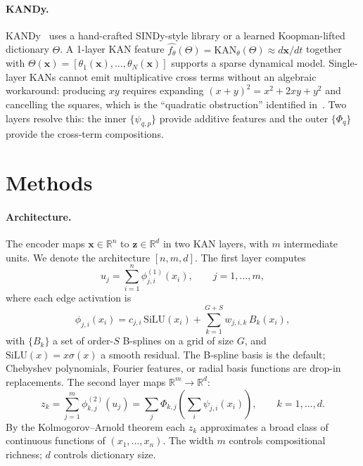 \documentclass{article}
\newcommand{\R}{\mathbb{R}}
\newcommand{\x}{\bm{x}}
\newcommand{\z}{\bm{z}}
\begin{document}
\paragraph{KANDy.}
KANDy~\cite{kandy} uses a hand-crafted SINDy-style library or a learned
Koopman-lifted dictionary $\Theta$. A 1-layer KAN feature
$\hat{f_\theta}(\Theta) = \mathrm{KAN}_\theta(\Theta) \approx d\x/dt$ together
with $\Theta(\x) = [\theta_1(\x),\dots,\theta_N(\x)]$ supports a sparse
dynamical model. Single-layer KANs cannot emit multiplicative cross terms
without an algebraic workaround: producing $xy$ requires expanding
$(x+y)^2 = x^2 + 2xy + y^2$ and cancelling the squares, which is the
``quadratic obstruction'' identified in~\cite{kandy}. Two layers resolve this:
the inner $\{\psi_{q,p}\}$ provide additive features and the outer $\{\Phi_q\}$
provide the cross-term compositions.


\section*{Methods}

\paragraph{Architecture.}
The encoder maps $\x\in\R^n$ to $\z\in\R^d$ in two KAN layers, with $m$
intermediate units. We denote the architecture $[n,m,d]$. The first layer
computes
\begin{equation}
  u_j = \sum_{i=1}^{n}\phi^{(1)}_{j,i}(x_i),\qquad j=1,\dots,m,
  \label{eq:layer1}
\end{equation}
where each edge activation is
\begin{equation}
  \phi_{j,i}(x_i) = c_{j,i}\,\mathrm{SiLU}(x_i)
    + \sum_{k=1}^{G+S} w_{j,i,k}\,B_k(x_i),
  \label{eq:kanlinear}
\end{equation}
with $\{B_k\}$ a set of order-$S$ B-splines on a grid of size $G$, and
$\mathrm{SiLU}(x) = x\sigma(x)$ a smooth residual. The B-spline basis is the
default; Chebyshev polynomials, Fourier features, or radial basis functions are
drop-in replacements. The second layer maps $\R^m\to\R^d$:
\begin{equation}
  z_k = \sum_{j=1}^{m}\phi^{(2)}_{k,j}(u_j)
      = \sum_j \Phi_{k,j}\!\left(\sum_i \psi_{j,i}(x_i)\right),\qquad
      k=1,\dots,d.
  \label{eq:layer2}
\end{equation}
By the Kolmogorov--Arnold theorem each $z_k$ approximates a broad class of
continuous functions of $(x_1,\dots,x_n)$. The width $m$ controls compositional
richness; $d$ controls dictionary size.
\end{document}
